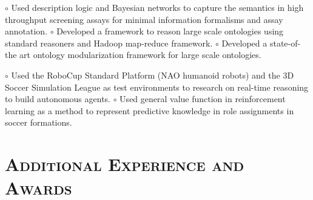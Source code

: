 \begin{resume}
\begin{position}
$\circ$ Used description logic and Bayesian networks to capture the semantics 
in high throughput screening assays for minimal information formalisms and assay annotation. 
\newline $\circ$ Developed a framework to reason large scale ontologies using standard reasoners 
and 
Hadoop map-reduce framework. \newline $\circ$ Developed a state-of-the art ontology modularization 
framework for large scale 
ontologies. 
\end{position}

\begin{position}
$\circ$ Used the RoboCup Standard Platform (NAO humanoid robots) and the 3D Soccer Simulation 
League as 
test environments to research on real-time reasoning to build autonomous agents. \newline $\circ$  
Used 
general value function in reinforcement learning as a method to  represent predictive knowledge in 
role 
assignments in soccer formations.
\end{position}












\vspace{-2mm}
\section{\textsc{Additional Experience and Awards}}


\end{resume}
